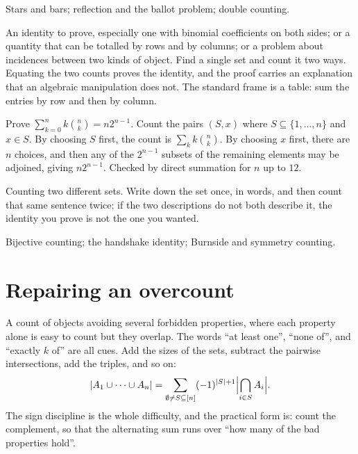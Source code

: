 \begin{seealsob}Stars and bars; reflection and the ballot problem; double counting.\end{seealsob}

\cue An identity to prove, especially one with binomial coefficients on both sides; or a quantity that can be totalled by rows and by columns; or a problem about incidences between two kinds of object.
\method Find a single set and count it two ways. Equating the two counts proves the identity, and the proof carries an explanation that an algebraic manipulation does not. The standard frame is a table: sum the entries by row and then by column.

\begin{worked}
Prove $\sum_{k=0}^{n}k\binom{n}{k}=n2^{n-1}$. Count the pairs $(S,x)$ where $S\subseteq\{1,\ldots,n\}$ and $x\in S$. By choosing $S$ first, the count is $\sum_{k}k\binom{n}{k}$. By choosing $x$ first, there are $n$ choices, and then any of the $2^{n-1}$ subsets of the remaining elements may be adjoined, giving $n2^{n-1}$. Checked by direct summation for $n$ up to $12$.
\end{worked}

\begin{trap}
Counting two different sets. Write down the set once, in words, and then count that same sentence twice; if the two descriptions do not both describe it, the identity you prove is not the one you wanted.
\end{trap}

\begin{seealsob}Bijective counting; the handshake identity; Burnside and symmetry counting.\end{seealsob}

\section{Repairing an overcount}

\cue A count of objects avoiding several forbidden properties, where each property alone is easy to count but they overlap. The words ``at least one'', ``none of'', and ``exactly $k$ of'' are all cues.
\method Add the sizes of the sets, subtract the pairwise intersections, add the triples, and so on:
\[
\left\lvert A_{1}\cup\cdots\cup A_{n}\right\rvert=\sum_{\emptyset\neq S\subseteq[n]}(-1)^{\left\lvert S\right\rvert+1}\Bigl|\bigcap_{i\in S}A_{i}\Bigr|.
\]
The sign discipline is the whole difficulty, and the practical form is: count the complement, so that the alternating sum runs over ``how many of the bad properties hold''.

